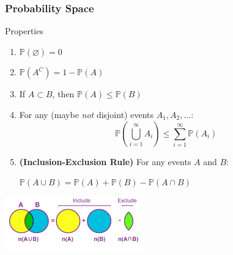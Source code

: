 \documentclass{beamer}
\newcommand{\PP}{\mathbb{P}}
\begin{document}


\begin{frame}
    \frametitle{Probability Space}
    \begin{block}{Properties}
        \begin{enumerate}[<+->]
            \item $\PP(\varnothing)=0$
            \item $\PP(A^C) = 1 - \PP(A)$
            \item If $A\subset B$, then $\PP(A)\le \PP(B)$
            \item For any (maybe \textit{not} disjoint) events $A_1,A_2,\dots$:
            \[
\PP\left(\bigcup_{i=1}^\infty A_i\right) \le \sum_{i=1}^\infty \PP(A_i)
            \]
            \item \textbf{(Inclusion-Exclusion Rule)} For any events $A$ and $B$:
            \begin{center}
                \(\PP(A \cup B) = \PP(A) + \PP(B) - \PP(A \cap B)\)
            \end{center}
\end{enumerate}
    \end{block}
    \pause           \begin{center}
    \includegraphics[width=0.45\textwidth, height=\textheight, keepaspectratio]{incl.png}
  \end{center}
\end{frame}


\end{document}
